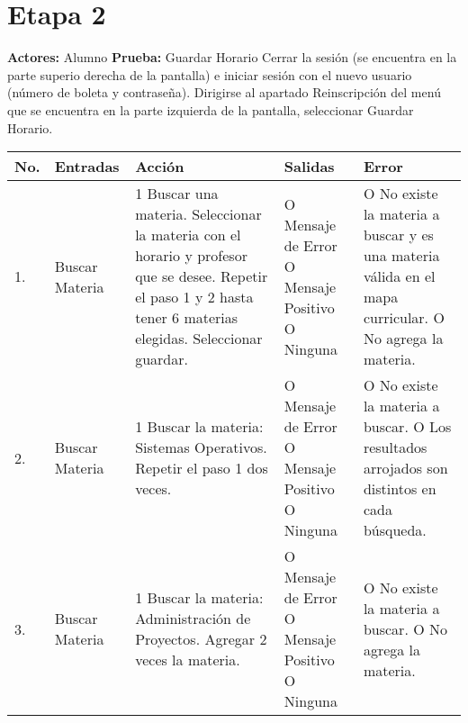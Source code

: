 \section*{Etapa 2}
\textbf{Actores:} Alumno\newline
\textbf{Prueba:} Guardar Horario
Cerrar la sesión (se encuentra en la parte superio derecha de la pantalla) e iniciar sesión con el nuevo usuario (número de boleta y contraseña).\newline
Dirigirse al apartado Reinscripción del menú que se encuentra en la parte izquierda de la pantalla, seleccionar Guardar Horario. 
\begin{longtable}{|p{0.7cm}|p{3cm}|p{6cm}|p{2.3cm}|p{3cm}|}
    \hline	
	\textbf{No.}
	&
	\textbf{Entradas}	
	&
	\textbf{Acción}
	&
	\textbf{Salidas}
	&
	\textbf{Error}
	\\
	\hline
	1.
	&
	Buscar Materia	
	&
	1 Buscar una materia.\newline
	2 Seleccionar la materia con el horario y profesor que se desee.\newline
	3 Repetir el paso 1 y 2 hasta tener 6 materias elegidas.\newline
	4 Seleccionar guardar.	 	
	&
	O Mensaje de Error\newline
 	O Mensaje Positivo\newline
 	O Ninguna
 	&
 	O No existe la materia a buscar y es una materia válida en el mapa curricular.\newline
 	O No agrega la materia.\\
 	\hline
 	2.
 	&
	Buscar Materia	
	&
	1 Buscar la materia: Sistemas Operativos.\newline
	2 Repetir el paso 1 dos veces.
	&
	O Mensaje de Error\newline
 	O Mensaje Positivo\newline
 	O Ninguna
 	&
 	O No existe la materia a buscar.\newline
 	O Los resultados arrojados son distintos en cada búsqueda.\\
	\hline
	3.
	&
	Buscar Materia	
	&
	1 Buscar la materia: Administración de Proyectos. \newline
	2 Agregar 2 veces la materia.
	&
	O Mensaje de Error\newline
 	O Mensaje Positivo\newline
 	O Ninguna
 	&
 	O No existe la materia a buscar.\newline
 	O No agrega la materia.\\
 	\hline
\end{longtable}
